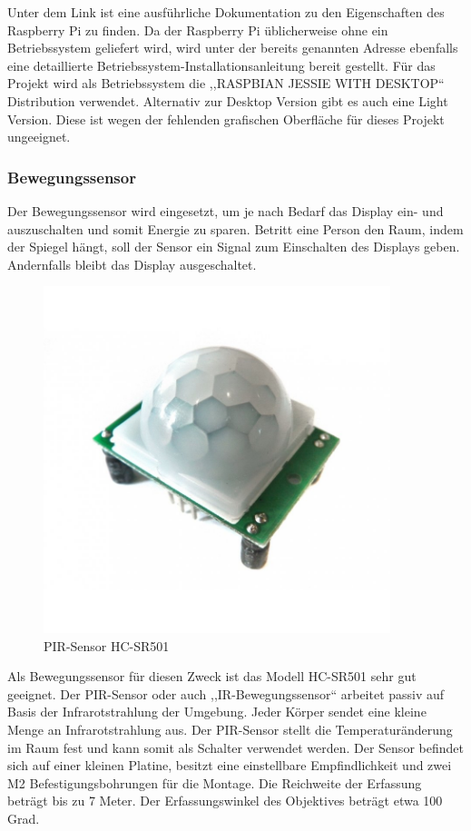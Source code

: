 Unter dem Link \cite{rasporg} ist eine ausführliche Dokumentation zu den Eigenschaften des Raspberry Pi zu finden. Da der Raspberry Pi üblicherweise ohne ein Betriebssystem geliefert wird, wird unter der bereits genannten Adresse ebenfalls eine detaillierte Betriebssystem-Installationsanleitung bereit gestellt. Für das Projekt wird als Betriebssystem die ,,RASPBIAN JESSIE WITH DESKTOP`` Distribution verwendet. Alternativ zur Desktop Version gibt es auch eine Light Version. Diese ist wegen der fehlenden grafischen Oberfläche für dieses Projekt ungeeignet.

\subsubsection*{Bewegungssensor}
Der Bewegungssensor wird eingesetzt, um je nach Bedarf das Display ein- und auszuschalten und somit Energie zu sparen. Betritt eine Person den Raum, indem der Spiegel hängt, soll  der Sensor ein Signal zum Einschalten des Displays geben. Andernfalls bleibt das Display ausgeschaltet. 

\begin{figure}
	\includegraphics[width=0.9\textwidth]{bilder/PIR-Sensor.jpg}
	\caption{PIR-Sensor HC-SR501}
\end{figure}	
Als Bewegungssensor für diesen Zweck ist das Modell HC-SR501 sehr gut geeignet. Der PIR-Sensor oder auch ,,IR-Bewegungssensor`` arbeitet passiv auf Basis der Infrarotstrahlung der Umgebung. Jeder Körper sendet eine kleine Menge an Infrarotstrahlung aus. Der PIR-Sensor stellt die Temperaturänderung im Raum fest und kann somit als Schalter verwendet werden. Der Sensor befindet sich auf einer kleinen Platine, besitzt eine einstellbare Empfindlichkeit und zwei M2 Befestigungsbohrungen für die Montage. Die Reichweite der Erfassung beträgt bis zu 7 Meter. Der Erfassungswinkel des Objektives beträgt etwa 100 Grad. 

